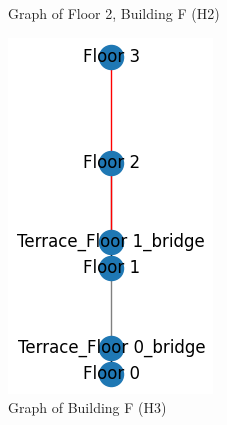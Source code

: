 \begin{figure}[htb]
\begin{subfigure}{.6\textwidth}
      \caption{Graph of Floor 2, Building F (H2)}
    \end{subfigure}
    \begin{subfigure}{.2\textwidth}
      \centering
      \includegraphics[width=\textwidth]{figures/40_concept/ltc_graph_building_f.png}
      \caption{Graph of Building F (H3)}
    \end{subfigure}%
    \begin{subfigure}{.8\textwidth}
      \centering

\end{subfigure}
\end{figure}
